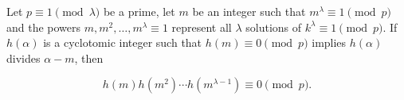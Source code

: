 Let $p \equiv 1 \pmod{\lambda}$ be a prime, let $m$ be an integer such that $m^\lambda \equiv 1 \pmod{p}$ and the powers $m, m^2, \ldots, m^\lambda \equiv 1$ represent all $\lambda$ solutions of $k^\lambda \equiv 1 \pmod{p}$. If $h(\alpha)$ is a cyclotomic integer such that $h(m) \equiv 0 \pmod{p}$ implies $h(\alpha)$ divides $\alpha - m$, then

$$h(m)h(m^2) \cdots h(m^{\lambda - 1}) \equiv 0 \pmod{p}.$$
